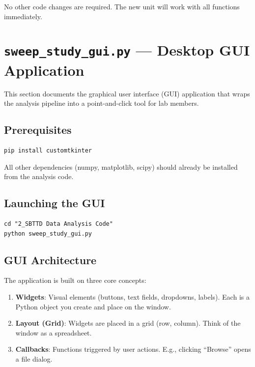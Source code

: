 \documentclass[11pt, letterpaper]{article}
\begin{document}
No other code changes are required. The new unit will work with all
functions immediately.

\newpage
\section{\texttt{sweep\_study\_gui.py} --- Desktop GUI Application}
\label{sec:gui}

This section documents the graphical user interface (GUI) application
that wraps the analysis pipeline into a point-and-click tool for lab
members.

\subsection{Prerequisites}

\begin{lstlisting}[numbers=none]
pip install customtkinter
\end{lstlisting}

All other dependencies (numpy, matplotlib, scipy) should already be
installed from the analysis code.

\subsection{Launching the GUI}

\begin{lstlisting}[numbers=none]
cd "2_SBTTD Data Analysis Code"
python sweep_study_gui.py
\end{lstlisting}

\subsection{GUI Architecture}

The application is built on three core concepts:

\begin{enumerate}[nosep]
    \item \textbf{Widgets}: Visual elements (buttons, text fields,
          dropdowns, labels). Each is a Python object you create and
          place on the window.
    \item \textbf{Layout (Grid)}: Widgets are placed in a grid (row,
          column). Think of the window as a spreadsheet.
    \item \textbf{Callbacks}: Functions triggered by user actions. E.g.,
          clicking ``Browse'' opens a file dialog.
\end{enumerate}
\end{document}
